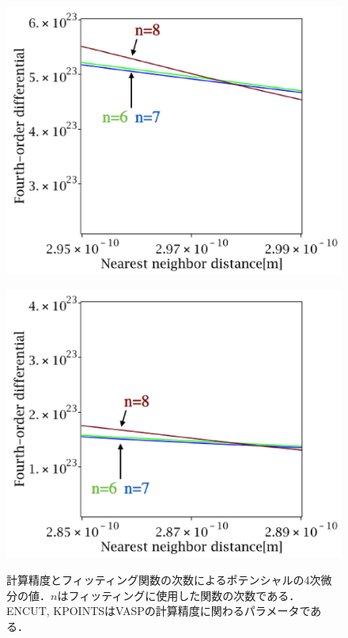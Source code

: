 \begin{figure}[htbp]
  \begin{minipage}[b]{0.5\linewidth}
  \centering
  \includegraphics[keepaspectratio, scale=0.41]
  {../image/fit_au_label.eps}
  \label{fit5}
 \end{minipage}
 \begin{minipage}[b]{0.5\linewidth}
  \centering
  \includegraphics[keepaspectratio, scale=0.41]
  {../image/fit_al_label.eps}
  \label{fit6}
 \end{minipage}
 \caption{計算精度とフィッティング関数の次数によるポテンシャルの4次微分の値．$n$はフィッティングに使用した関数の次数である．ENCUT, KPOINTSはVASPの計算精度に関わるパラメータである．}\label{fig:fit}
\end{figure}

